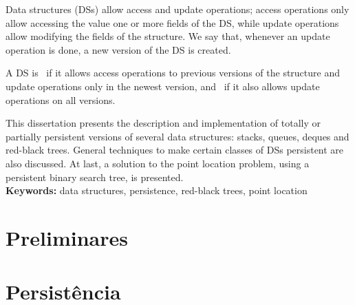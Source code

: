 \documentclass[11pt,oneside,a4paper, openany]{book}
\begin{document}
Data structures (DSs) allow access and update operations; access operations only allow accessing the value one or more fields of the DS, while update operations allow modifying the fields of the structure. We say that, whenever an update operation is done, a new version of the DS is created.

A DS is~ if it allows access operations to previous versions of the structure and update operations only in the newest version, and~ if it also allows update operations on all versions.

This dissertation presents the description and implementation of totally or partially persistent versions of several data structures: stacks, queues, deques and red-black trees. General techniques to make certain classes of DSs persistent are also discussed. At last, a solution to the point location problem, using a persistent binary search tree, is presented.
\\

\noindent \textbf{Keywords:} data structures, persistence, red-black trees, point location


\setcounter{tocdepth}{1}

\begingroup
\let\cleardoublepage\clearpage
\tableofcontents
\endgroup

\mainmatter
{}



\part{Preliminares} \label{part:prelim}
%





\part{Persistência} \label{part:persist}
%












%
%
%





\end{document}
